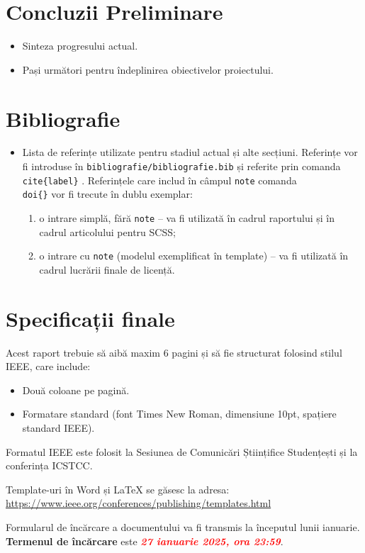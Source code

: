 \documentclass[conference, 10pt]{IEEEtran}
\begin{document}
\section{Concluzii Preliminare}
\begin{itemize}
    \item Sinteza progresului actual.
    \item Pași următori pentru îndeplinirea obiectivelor proiectului.
\end{itemize}

\section{Bibliografie}
\begin{itemize}
    \item Lista de referințe utilizate pentru stadiul actual și alte secțiuni. Referințe vor fi introduse în \texttt{bibliografie/bibliografie.bib} și referite prin comanda \texttt{\\cite\{label\}} \cite{misc:web:rfc7231}. Referințele care includ în câmpul \texttt{note} comanda \texttt{\\doi\{\}} vor fi trecute în dublu exemplar:
    \begin{enumerate}
        \item o intrare simplă, fără \texttt{note} -- va fi utilizată în cadrul raportului și în cadrul articolului pentru SCSS;
        \item o intrare cu \texttt{note} (modelul exemplificat în template) -- va fi utilizată în cadrul lucrării finale de licență.
    \end{enumerate}
\end{itemize}

\section{Specificații finale}

Acest raport trebuie să aibă maxim 6 pagini și să fie structurat folosind stilul IEEE, care include:
\begin{itemize}
    \item Două coloane pe pagină.
    \item Formatare standard (font Times New Roman, dimensiune 10pt, spațiere standard IEEE).
\end{itemize}
Formatul IEEE este folosit la Sesiunea de Comunicări Științifice Studențești și la conferința ICSTCC.

Template-uri în Word și LaTeX se găsesc la adresa:  
\url{https://www.ieee.org/conferences/publishing/templates.html}

Formularul de încărcare a documentului va fi transmis la începutul lunii ianuarie.  
\textbf{Termenul de încărcare} este \textbf{\textit{\textcolor{red}{\textit{27 ianuarie 2025, ora 23:59}}}}.

\nopagebreak


\end{document}
